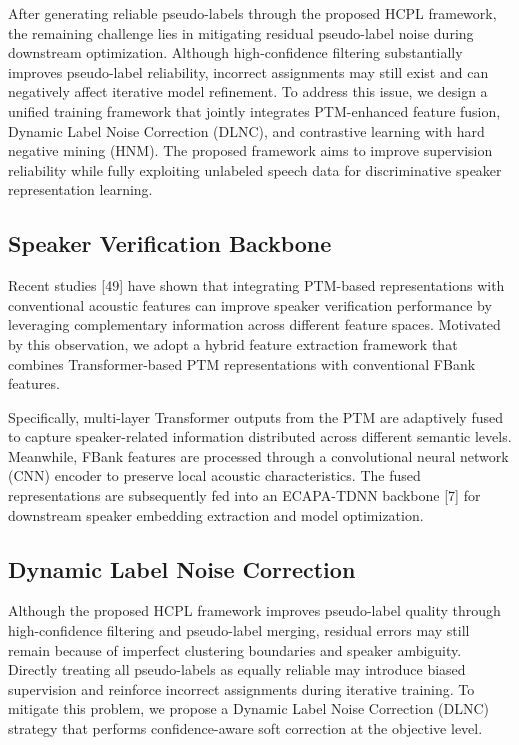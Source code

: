 \documentclass[lettersize,journal]{IEEEtran}
\begin{document}
After generating reliable pseudo-labels through the proposed HCPL framework, the remaining challenge lies in mitigating residual pseudo-label noise during downstream optimization. Although high-confidence filtering substantially improves pseudo-label reliability, incorrect assignments may still exist and can negatively affect iterative model refinement. To address this issue, we design a unified training framework that jointly integrates PTM-enhanced feature fusion, Dynamic Label Noise Correction (DLNC), and contrastive learning with hard negative mining (HNM). The proposed framework aims to improve supervision reliability while fully exploiting unlabeled speech data for discriminative speaker representation learning.

\subsection{Speaker Verification Backbone}

Recent studies [49] have shown that integrating PTM-based representations with conventional acoustic features can improve speaker verification performance by leveraging complementary information across different feature spaces. Motivated by this observation, we adopt a hybrid feature extraction framework that combines Transformer-based PTM representations with conventional FBank features.

Specifically, multi-layer Transformer outputs from the PTM are adaptively fused to capture speaker-related information distributed across different semantic levels. Meanwhile, FBank features are processed through a convolutional neural network (CNN) encoder to preserve local acoustic characteristics. The fused representations are subsequently fed into an ECAPA-TDNN backbone [7] for downstream speaker embedding extraction and model optimization.

\subsection{Dynamic Label Noise Correction}

Although the proposed HCPL framework improves pseudo-label
quality through high-confidence filtering and pseudo-label
merging, residual errors may still remain because of imperfect
clustering boundaries and speaker ambiguity. Directly treating
all pseudo-labels as equally reliable may introduce biased
supervision and reinforce incorrect assignments during iterative
training. To mitigate this problem, we propose a Dynamic Label
Noise Correction (DLNC) strategy that performs confidence-aware
soft correction at the objective level.
\end{document}
